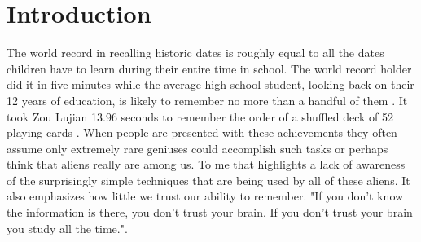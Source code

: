 \section{Introduction} \label{sec:body_motivation}

The world record in recalling historic dates is roughly equal to all the dates children have to learn during their entire time in school. The world record holder did it in five minutes while the average high-school student, looking back on their 12 years of education, is likely to remember no more than a handful of them \cite{how_to_become_a_memory_master}. It took Zou Lujian 13.96 seconds to remember the order of a shuffled deck of 52 playing cards \cite{record_recall_playing_cards}. When people are presented with these achievements they often assume only extremely rare geniuses could accomplish such tasks or perhaps think that aliens really are among us. To me that highlights a lack of awareness of the surprisingly simple techniques that are being used by all of these aliens. It also emphasizes how little we trust our ability to remember. "If you don't know the information is there, you don't trust your brain. If you don't trust your brain you study all the time."\cite{how_to_become_a_memory_master}. 

